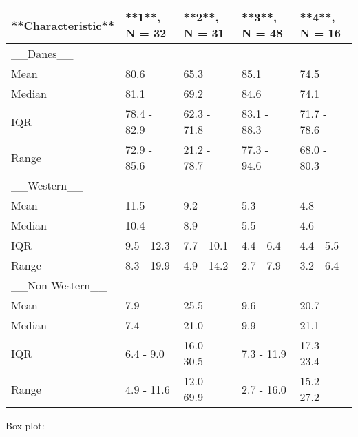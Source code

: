\documentclass[
  12pt,
]{article}
\begin{document}
\begin{tabular}{l|l|l|l|l}
\hline
**Characteristic** & **1**, N = 32 & **2**, N = 31 & **3**, N = 48 & **4**, N = 16\\
\hline
\_\_Danes\_\_ &  &  &  & \\
\hline
Mean & 80.6 & 65.3 & 85.1 & 74.5\\
\hline
Median & 81.1 & 69.2 & 84.6 & 74.1\\
\hline
IQR & 78.4 - 82.9 & 62.3 - 71.8 & 83.1 - 88.3 & 71.7 - 78.6\\
\hline
Range & 72.9 - 85.6 & 21.2 - 78.7 & 77.3 - 94.6 & 68.0 - 80.3\\
\hline
\_\_Western\_\_ &  &  &  & \\
\hline
Mean & 11.5 & 9.2 & 5.3 & 4.8\\
\hline
Median & 10.4 & 8.9 & 5.5 & 4.6\\
\hline
IQR & 9.5 - 12.3 & 7.7 - 10.1 & 4.4 - 6.4 & 4.4 - 5.5\\
\hline
Range & 8.3 - 19.9 & 4.9 - 14.2 & 2.7 - 7.9 & 3.2 - 6.4\\
\hline
\_\_Non-Western\_\_ &  &  &  & \\
\hline
Mean & 7.9 & 25.5 & 9.6 & 20.7\\
\hline
Median & 7.4 & 21.0 & 9.9 & 21.1\\
\hline
IQR & 6.4 - 9.0 & 16.0 - 30.5 & 7.3 - 11.9 & 17.3 - 23.4\\
\hline
Range & 4.9 - 11.6 & 12.0 - 69.9 & 2.7 - 16.0 & 15.2 - 27.2\\
\hline
\end{tabular}

Box-plot:
\end{document}
